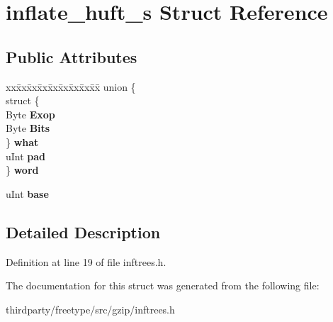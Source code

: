 \hypertarget{structinflate__huft__s}{}\section{inflate\+\_\+huft\+\_\+s Struct Reference}
\label{structinflate__huft__s}
\subsection*{Public Attributes}
\begin{DoxyCompactItemize}
\item 
\mbox{\label{structinflate__huft__s_ae74d1dd40211667ee81193e953803299}} 
\begin{tabbing}
xx\=xx\=xx\=xx\=xx\=xx\=xx\=xx\=xx\=\kill
union \{\\
\>struct \{\\
\>\>Byte {\bfseries Exop}\\
\>\>Byte {\bfseries Bits}\\
\>\} {\bfseries what}\\
\>uInt {\bfseries pad}\\
\} {\bfseries word}\\

\end{tabbing}\item 
\mbox{\label{structinflate__huft__s_a58a53b1d36c6cfc032646dc64def6cb3}} 
u\+Int {\bfseries base}
\end{DoxyCompactItemize}


\subsection{Detailed Description}


Definition at line 19 of file inftrees.\+h.



The documentation for this struct was generated from the following file\+:\begin{DoxyCompactItemize}
\item 
thirdparty/freetype/src/gzip/inftrees.\+h\end{DoxyCompactItemize}
